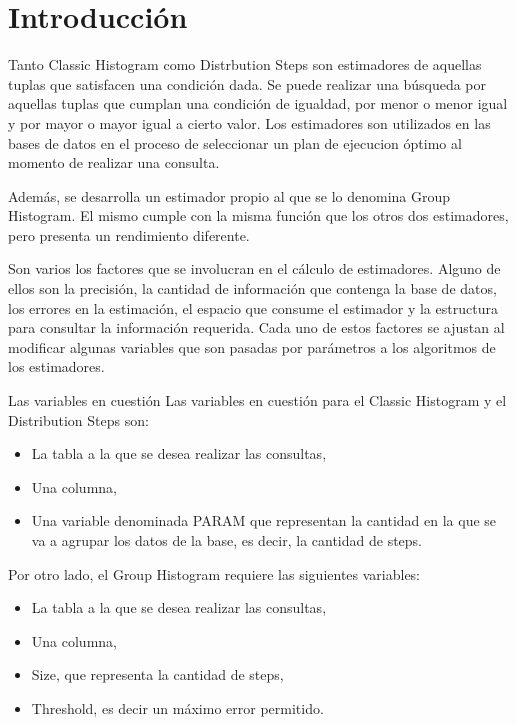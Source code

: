 \documentclass[10pt, a4paper,english,spanish,hidelinks]{article}
\begin{document}
\pagestyle{myheadings}
\maketitle
{}

\thispagestyle{empty}
\tableofcontents

\setcounter{section}{-1}

\newpage
\section{Introducción}

Tanto Classic Histogram como Distrbution Steps son estimadores de aquellas tuplas que satisfacen una condición dada. Se puede realizar una búsqueda por aquellas tuplas que cumplan una condición de igualdad, por menor o menor igual y por mayor o mayor igual a cierto valor. Los estimadores son utilizados en las bases de datos en el proceso de seleccionar un plan de ejecucion óptimo 
al momento de realizar una consulta.

Además, se desarrolla un estimador propio al que se lo denomina Group Histogram. El mismo cumple con la misma función que los otros dos estimadores, pero presenta un rendimiento diferente. 

Son varios los factores que se involucran en el cálculo de estimadores. Alguno de ellos
son la precisión, la cantidad de información que contenga la base de datos, los errores
en la estimación, el espacio que consume el estimador y la estructura para consultar la
información requerida. Cada uno de estos factores se ajustan al modificar algunas variables
que son pasadas por parámetros a los algoritmos de los estimadores.

Las variables en cuestión Las variables en cuestión para el Classic Histogram y el Distribution Steps son:
\begin{itemize}
\item La tabla a la que se desea realizar las consultas,
\item Una columna,
\item Una variable denominada PARAM que representan la cantidad en la que se va a agrupar
los datos de la base, es decir, la cantidad de steps.
\end{itemize}


Por otro lado, el Group Histogram requiere las siguientes variables:
\begin{itemize}
	\item La tabla a la que se desea realizar las consultas,
	\item Una columna,
  	\item Size, que representa la cantidad de steps,
  	\item Threshold, es decir un máximo error permitido.
\end{itemize}
\end{document}
